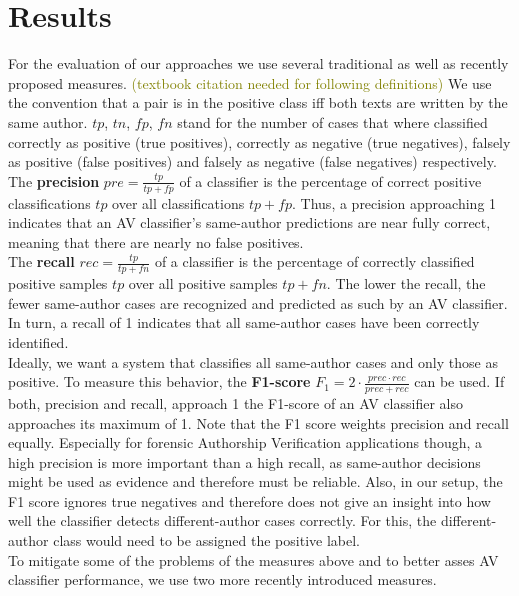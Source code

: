 \chapter{Results}\label{results}
For the evaluation of our approaches we use several traditional as well as recently proposed measures.
\textcolor{olive}{(textbook citation needed for following definitions)} We use the convention that a pair is in the positive class iff both texts are written by the same author.
$tp$, $tn$, $fp$, $fn$ stand for the number of cases that where classified correctly as positive (true positives), correctly as negative (true negatives), falsely as positive (false positives) and falsely as negative (false negatives) respectively.\\
The \textbf{precision} $pre = \frac{tp}{tp+fp}$ of a classifier is the percentage of correct positive classifications $tp$ over all classifications $tp+fp$.
Thus, a precision approaching 1 indicates that an AV classifier's same-author predictions are near fully correct, meaning that there are nearly no false positives.\\
The \textbf{recall} $rec = \frac{tp}{tp+fn}$ of a classifier is the percentage of correctly classified positive samples $tp$ over all positive samples $tp+fn$.
The lower the recall, the fewer same-author cases are recognized and predicted as such by an AV classifier.
In turn, a recall of 1 indicates that all same-author cases have been correctly identified.\\
Ideally, we want a system that classifies all same-author cases and only those as positive.
To measure this behavior, the \textbf{F1-score} $F_1 = 2\cdot\frac{prec\cdot{}rec}{prec+rec}$ can be used.
If both, precision and recall, approach 1 the F1-score of an AV classifier also approaches its maximum of 1.
Note that the F1 score weights precision and recall equally.
Especially for forensic Authorship Verification applications though, a high precision is more important than a high recall, as same-author decisions might be used as evidence and therefore must be reliable.
Also, in our setup, the F1 score ignores true negatives and therefore does not give an insight into how well the classifier detects different-author cases correctly.
For this, the different-author class would need to be assigned the positive label.\\
To mitigate some of the problems of the measures above and to better asses AV classifier performance, we use two more recently introduced measures.
